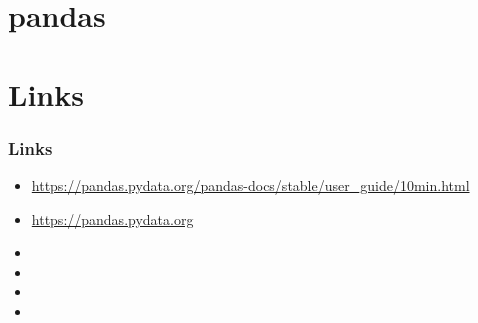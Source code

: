 \documentclass[ngerman]{beamer}
\begin{document}
\section{pandas}


\section{Links}


\begin{frame}
\frametitle{Links}

\begin{itemize}
	\item \url{https://pandas.pydata.org/pandas-docs/stable/user_guide/10min.html}
	\item \url{https://pandas.pydata.org}
	\item 
	\item 
	\item 
	\item 
\end{itemize}



\end{frame}
\end{document}
